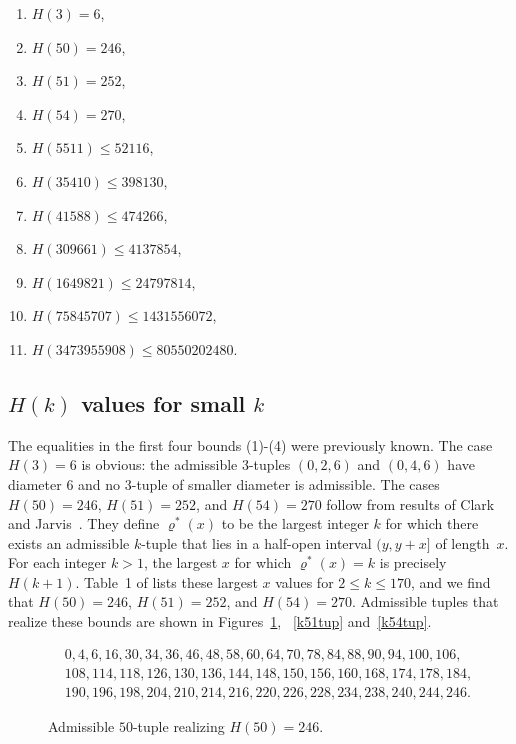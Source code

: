 \documentclass{bmcart}
\theoremstyle{plain}
\theoremstyle{definition}
\begin{document}
\begin{enumerate}
\item $H(3) = 6$,
\item $H(50) = 246$,
\item $H(51) = 252$,
\item $H(54) = 270$,
\item $H(\num{5511}) \leq \num{52116}$,
\item $H(\num{35410}) \leq \num{398130}$,
\item $H(\num{41588}) \leq \num{474266}$,
\item $H(\num{309661}) \leq \num{4137854}$,
\item $H(\num{1649821}) \leq \num{24797814}$,
\item $H(\num{75845707}) \leq \num{1431556072}$,
\item $H(\num{3473955908}) \leq \num{80550202480}$.
\end{enumerate}
\smallskip

\subsection{\texorpdfstring{$H(k)$}{H(k)} values for small \texorpdfstring{$k$}{k}}

The equalities in the first four bounds (1)-(4) were previously known.
The case $H(3)=6$ is obvious: the admissible 3-tuples $(0,2,6)$ and $(0,4,6)$ have diameter $6$ and no $3$-tuple of smaller diameter is admissible.
The cases $H(50)=246$, $H(51)=252$, and $H(54)=270$ follow from results of Clark and Jarvis~\cite{clark}.
They define $\varrho^*(x)$ to be the largest integer $k$ for which there exists an admissible $k$-tuple that lies in a half-open interval $(y,y+x]$ of length~$x$.
For each integer $k>1$, the largest $x$ for which $\varrho^*(x)=k$ is precisely $H(k+1)$.
Table~1 of \cite{clark} lists these largest $x$ values for $2\le k\le 170$, and we find that $H(50)=246$, $H(51)=252$, and $H(54)=270$.
Admissible tuples that realize these bounds are shown in Figures~\ref{k50tup}, ~\ref{k51tup} and~\ref{k54tup}.

\begin{figure}
\begin{align*}
&0,4,6,16,30,34,36,46,48,58,60,64,70,78,84,88,90,94,100,106,\\
&108,114,118,126,130,136,144,148,150,156,160,168,174,178,184,\\
&190,196,198,204,210,214,216,220,226,228,234,238,240,244,246.
\end{align*}
\caption{Admissible $50$-tuple realizing $H(50)=246$.}\label{k50tup}
\end{figure}
\end{document}
